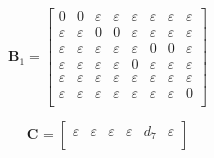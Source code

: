 \documentclass[11pt, a4paper, fleqn]{article}
\begin{document}
\begin{equation*}
\mathbf{B}_{1} = 
\left[\begin{array}{ cccccccc }
0	&0	&\varepsilon	&\varepsilon	&\varepsilon	&\varepsilon	&\varepsilon	&\varepsilon\\
\varepsilon	&\varepsilon	&0	&0	&\varepsilon	&\varepsilon	&\varepsilon	&\varepsilon\\
\varepsilon	&\varepsilon	&\varepsilon	&\varepsilon	&\varepsilon	&0	&0	&\varepsilon\\
\varepsilon	&\varepsilon	&\varepsilon	&\varepsilon	&0	&\varepsilon	&\varepsilon	&\varepsilon\\
\varepsilon	&\varepsilon	&\varepsilon	&\varepsilon	&\varepsilon	&\varepsilon	&\varepsilon	&\varepsilon\\
\varepsilon	&\varepsilon	&\varepsilon	&\varepsilon	&\varepsilon	&\varepsilon	&\varepsilon	&0\\
\end{array}\right]
\end{equation*}

\begin{equation*}
\mathbf{C}_{{}} = 
\left[\begin{array}{ cccccc }
\varepsilon	&\varepsilon	&\varepsilon	&\varepsilon	&d_7	&\varepsilon\\
\end{array}\right]
\end{equation*}
\end{document}
